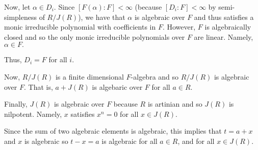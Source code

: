 \documentclass[12pt]{Qual}
\begin{document}
\begin{solution}
Now, let $\alpha\in D_i$. Since $[F(\alpha):F]<\infty$ (because $[D_i:F]<\infty$ by semi-simpleness of $R/J(R)$), we have that $\alpha$ is algebraic over $F$ and thus satisfies a monic irreducible polynomial with coefficients in $F$. However, $F$ is algebraically closed and so the only monic irreducible polynomials over $F$ are linear. Namely, $\alpha\in F.$

Thus, $D_i=F$ for all $i$.

Now, $R/J(R)$ is a finite dimensional $F$-algebra and so $R/J(R)$ is algebraic over $F$. That is, $a+J(R)$ is algebaric over $F$ for all $a\in R.$

Finally, $J(R)$ is algebraic over $F$ because $R$ is artinian and so $J(R)$ is nilpotent. Namely, $x$ satisfies $x^n=0$ for all $x\in J(R)$.

Since the sum of two algebraic elements is algebraic, this implies that $t=a+x$ and $x$ is algebraic so $t-x=a$ is algebraic for all $a\in R$, and for all $x\in J(R).$
\end{solution}
\newpage
\end{document}
